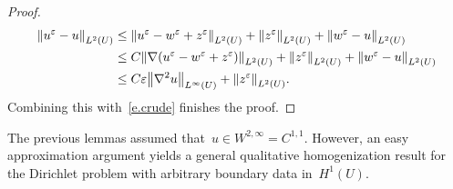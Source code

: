 \documentclass[11pt]{article} %
\numberwithin{equation}{section}
\theoremstyle{definition}
\let\originalleft\left
\let\originalright\right
\renewcommand{\left}{\mathopen{}\mathclose\bgroup\originalleft}
\renewcommand{\right}{\aftergroup\egroup\originalright}
\newcommand{\eps}{\varepsilon}
\newcommand{\ep}{\eps}
\begin{document}
\begin{proof}
\begin{align*}
\left\| u^\ep - u \right\|_{L^2(U)}
&
\leq
\left\| u^\ep - w^\ep+z^\ep \right\|_{L^2(U)}
+
\left\| z^\ep \right\|_{L^2(U)} 
+ \left\| w^\ep - u\right\|_{L^2(U)}
\notag \\ & 
\leq
C
\left\| \nabla( u^\ep - w^\ep+z^\ep) \right\|_{L^2(U)}
+
\left\| z^\ep \right\|_{L^2(U)} 
+ \left\| w^\ep - u\right\|_{L^2(U)}
\notag \\ & 
\leq
C \ep \left\| \nabla^2 u \right\|_{L^{\infty}(U)}
+
\left\| z^\ep\right\|_{L^2(U)}.
\end{align*}
Combining this with~\eqref{e.crude} finishes the proof. 
\end{proof}


The previous lemmas assumed that~$u\in W^{2,\infty}= C^{1,1}$. However, an easy approximation argument yields a general qualitative homogenization result for the Dirichlet problem with arbitrary boundary data in~$H^1(U)$. 
\end{document}
